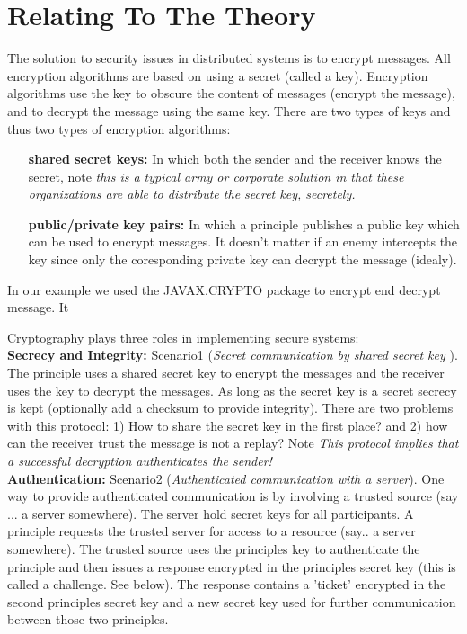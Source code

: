 \section{Relating To The Theory}

The solution to security issues in distributed systems is to encrypt messages. All encryption algorithms are based on using a secret (called a key). Encryption algorithms use the key to obscure the content of messages (encrypt the message), and to decrypt the message using the same key. There are two types of keys and thus two types of encryption algorithms: \\

\begin{itemize}
\item[  \textbf{shared secret keys:}] In which both the sender and the receiver knows the secret, note \textit{this is a typical army or corporate solution in that these organizations are able to distribute the secret key, secretely.}

\item[\textbf{public/private key pairs:}] In which a principle publishes a public key which can be used to encrypt messages. It doesn't matter if an enemy intercepts the key since only the coresponding private key can decrypt the message (idealy). \\
\end{itemize}

In our example we used the JAVAX.CRYPTO package to encrypt end decrypt message. It 


Cryptography plays three roles in implementing secure systems:\\

\textbf{Secrecy and Integrity:} Scenario1 (\textit{Secret communication by shared secret key }). The principle uses a shared secret key to encrypt the messages and the receiver uses the key to decrypt the messages. As long as the secret key is a secret secrecy is kept (optionally add a checksum to provide integrity). There are two problems with this protocol: 1) How to share the secret key in the first place? and 2) how can the receiver trust the message is not a replay? Note \textit{This protocol implies that a successful decryption authenticates the sender!} \\

\textbf{Authentication:} Scenario2 (\textit{Authenticated communication with a server}). One way to provide authenticated communication is by involving a trusted source (say ... a server somewhere). The server hold secret keys for all participants. A principle requests the trusted server for access to a resource (say.. a server somewhere). The trusted source uses the principles key to authenticate the principle and then issues a response encrypted in the principles secret key (this is called a challenge. See below). The response contains a 'ticket' encrypted in the second principles secret key and a new secret key used for further communication between those two principles. \\ 

